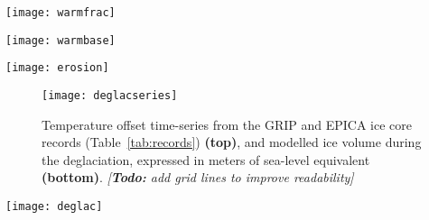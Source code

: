 \documentclass[tc, manuscript]{copernicus}
\newcommand{\todo}[1]{\emph{[\textbf{Todo:} #1]}}
\begin{document}
\begin{figure*}
  \texttt{[image: warmfrac]}
  \caption{Modelled fraction of warm-based ice cover during the ice-covered
           period. Note the dominance of warm-based conditions on the
           continental shelf and major glacial troughs of the coastal ranges.
           Hatches indicate areas that were covered by cold ice only.
           \todo{indicate location of the Skeena Mountains.}}
  \label{fig:warmfrac}
\end{figure*}

\begin{figure*}
  \texttt{[image: warmbase]}
  \caption{Modelled duration of warm-based ice cover during the last
           120\,kyr. Long ice cover durations combined with basal
           temperatures at the pressure-melting point may explain the strong
           glacial erosional imprint of the Skeena Mountains (SM) landscape.
           Hatches indicate areas that were covered by cold ice only.
           \todo{indicate location of the Skeena Mountains.}}
  \label{fig:warmbase}
\end{figure*}

\begin{figure*}
  \texttt{[image: erosion]}
  \caption{Modelled cumulative basal displacement (integrand of basal velocity)
           over the last 120\,kyr.
           \todo{remove this figure (see footnote in text).}}
  \label{fig:erosion}
\end{figure*}

\begin{figure}
  \texttt{[image: deglacseries]}
  \caption{Temperature offset time-series from the GRIP and EPICA ice core
           records (Table~\ref{tab:records}) \textbf{(top)}, and modelled ice
           volume during the deglaciation, expressed in meters of sea-level
           equivalent \textbf{(bottom)}.
           \todo{add grid lines to improve readability}}
  \label{fig:deglacseries}
\end{figure}

\begin{figure*}
  \texttt{[image: deglac]}
  \caption{Modelled age of the last deglaciation. Areas where the MIS~4 glacial
           advance exceeded the last glacial maximum advanced are marked in
           green. Hatches denote the Younger Dryas re-advance, which is more
           pronounced in the GRIP-driven simulation.}
  \label{fig:deglac}
\end{figure*}
\end{document}
